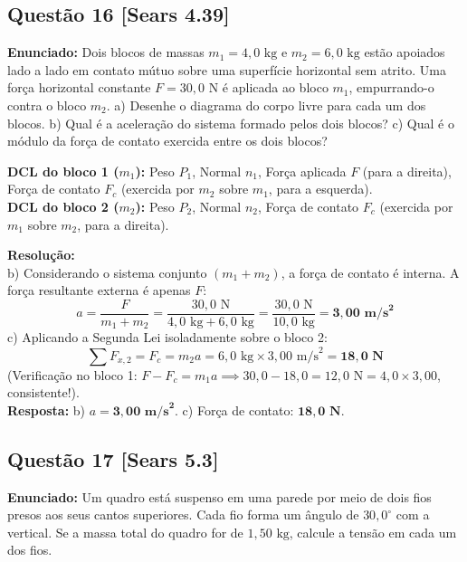 \documentclass[11pt,a4paper]{article}
\begin{document}
\vspace{0.3cm}
\subsection*{Questão 16 [Sears 4.39]}
\textbf{Enunciado:} Dois blocos de massas $m_1 = 4,0\text{ kg}$ e $m_2 = 6,0\text{ kg}$ estão apoiados lado a lado em contato mútuo sobre uma superfície horizontal sem atrito. Uma força horizontal constante $F = 30,0\text{ N}$ é aplicada ao bloco $m_1$, empurrando-o contra o bloco $m_2$. a) Desenhe o diagrama do corpo livre para cada um dos blocos. b) Qual é a aceleração do sistema formado pelos dois blocos? c) Qual é o módulo da força de contato exercida entre os dois blocos?

\begin{dclbox}
\textbf{DCL do bloco 1 ($m_1$):} Peso $P_1$, Normal $n_1$, Força aplicada $F$ (para a direita), Força de contato $F_{c}$ (exercida por $m_2$ sobre $m_1$, para a esquerda).\\
\textbf{DCL do bloco 2 ($m_2$):} Peso $P_2$, Normal $n_2$, Força de contato $F_{c}$ (exercida por $m_1$ sobre $m_2$, para a direita).
\end{dclbox}

\noindent
\textbf{Resolução:}\\
b) Considerando o sistema conjunto $(m_1 + m_2)$, a força de contato é interna. A força resultante externa é apenas $F$:
\[ a = \frac{F}{m_1 + m_2} = \frac{30,0\text{ N}}{4,0\text{ kg} + 6,0\text{ kg}} = \frac{30,0\text{ N}}{10,0\text{ kg}} = \mathbf{3,00\text{ m/s}^2} \]
c) Aplicando a Segunda Lei isoladamente sobre o bloco 2:
\[ \sum F_{x,2} = F_c = m_2 a = 6,0\text{ kg} \times 3,00\text{ m/s}^2 = \mathbf{18,0\text{ N}} \]
(Verificação no bloco 1: $F - F_c = m_1 a \implies 30,0 - 18,0 = 12,0\text{ N} = 4,0 \times 3,00$, consistente!).\\
\textbf{Resposta:} b) $a = \mathbf{3,00\text{ m/s}^2}$. c) Força de contato: $\mathbf{18,0\text{ N}}$.

\vspace{0.3cm}
\subsection*{Questão 17 [Sears 5.3]}
\textbf{Enunciado:} Um quadro está suspenso em uma parede por meio de dois fios presos aos seus cantos superiores. Cada fio forma um ângulo de $30,0^\circ$ com a vertical. Se a massa total do quadro for de $1,50\text{ kg}$, calcule a tensão em cada um dos fios.
\end{document}
